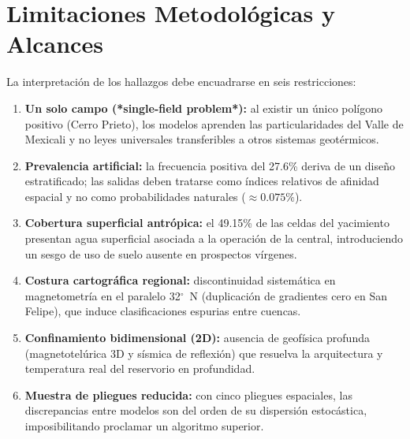 \documentclass[10pt,twocolumn,a4paper]{article}
\begin{document}
\section{Limitaciones Metodológicas y Alcances}
La interpretación de los hallazgos debe encuadrarse en seis restricciones:
\begin{enumerate}
\itemsep0pt  
\item \textbf{Un solo campo (*single-field problem*):} al existir un único polígono positivo (Cerro Prieto), los modelos aprenden las particularidades del Valle de Mexicali y no leyes universales transferibles a otros sistemas geotérmicos.
\item \textbf{Prevalencia artificial:} la frecuencia positiva del 27.6\% deriva de un diseño estratificado; las salidas deben tratarse como índices relativos de afinidad espacial y no como probabilidades naturales ($\approx 0.075\%$).
\item \textbf{Cobertura superficial antrópica:} el 49.15\% de las celdas del yacimiento presentan agua superficial asociada a la operación de la central, introduciendo un sesgo de uso de suelo ausente en prospectos vírgenes.
\item \textbf{Costura cartográfica regional:} discontinuidad sistemática en magnetometría en el paralelo 32$^\circ$~N (duplicación de gradientes cero en San Felipe), que induce clasificaciones espurias entre cuencas.
\item \textbf{Confinamiento bidimensional (2D):} ausencia de geofísica profunda (magnetotelúrica 3D y sísmica de reflexión) que resuelva la arquitectura y temperatura real del reservorio en profundidad.
\item \textbf{Muestra de pliegues reducida:} con cinco pliegues espaciales, las discrepancias entre modelos son del orden de su dispersión estocástica, imposibilitando proclamar un algoritmo superior.
\end{enumerate}
\end{document}
